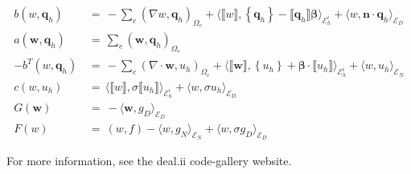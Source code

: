 \documentclass[12pt,letterpaper]{article}
\begin{document}
\begin{align}
b(w, \textbf{q}_{h}) \, &= \,
-
\sum_{e}  \left(\nabla w, \textbf{q}_{h} \right)_{\Omega_{e}}
+
\langle \llbracket w \rrbracket, 
\left\{\textbf{q}_{h} \right\} - \llbracket \textbf{q}_{h} \rrbracket \boldsymbol \beta \rangle_{\mathcal{E}_{h}^{i}} 
 + 
\langle w, \textbf{n} \cdot \textbf{q}_{h} \rangle_{\mathcal{E}_{D}}
\\
a(\textbf{w},\textbf{q}_{h}) \, &= \,  
\sum_{e} \left(\textbf{w}, \textbf{q}_{h} \right)_{\Omega_{e}} \\
-b^{T}(w, \textbf{q}_{h}) \, &= \,
-
\sum_{e}  \left(\nabla \cdot \textbf{w}, u_{h} \right)_{\Omega_{e}} 
+ 
\langle  \llbracket \textbf{w} \rrbracket, \left\{u_{h} \right\} + \boldsymbol \beta \cdot \llbracket u_{h} \rrbracket \rangle_{\mathcal{E}_h^{i} }
+
\langle w, u_{h} \rangle_{\mathcal{E}_{N} } \\
c(w,u_{h}) \, &= \,
\langle \llbracket w \rrbracket,  \sigma \llbracket u_{h} \rrbracket \rangle_{\mathcal{E}_{h}^{i}}
+
\langle  w, \sigma u_{h} \rangle_{\mathcal{E}_{D}}  \\
G(\textbf{w}) \ & = \ - \langle \textbf{w}, g_{D} \rangle_{\mathcal{E}_{D}}\\
F(w) \ & = \  (w,f) - \langle w, g_{N} \rangle_{\mathcal{E}_{N}}  + \langle w, \sigma g_{D} \rangle_{\mathcal{E}_{D}} 
\end{align}

For more information, see the deal.ii code-gallery website.
\end{document}
